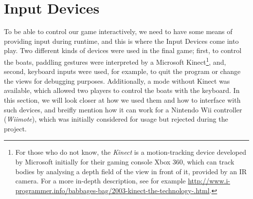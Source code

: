 \section{Input Devices}

To be able to control our game interactively, we need to have some means of providing input during runtime, and this is where the Input Devices come into play. Two different kinds of devices were used in the final game; first, to control the boats, paddling gestures were interpreted by a Microsoft Kinect\footnote{For those who do not know, the \emph{Kinect} is a motion-tracking device developed by Microsoft initially for their gaming console Xbox 360, which can track bodies by analysing a depth field of the view in front of it, provided by an IR camera. For a more in-depth description, see for example \url{http://www.i-programmer.info/babbages-bag/2003-kinect-the-technology-.html}.}, and, second, keyboard inputs were used, for example, to quit the program or change the views for debugging purposes. Additionally, a mode without Kinect was available, which allowed two players to control the boats with the keyboard. In this section, we will look closer at how we used them and how to interface with such devices, and breifly mention how it can work for a Nintendo Wii controller (\emph{Wiimote}), which was initially considered for usage but rejected during the project.

